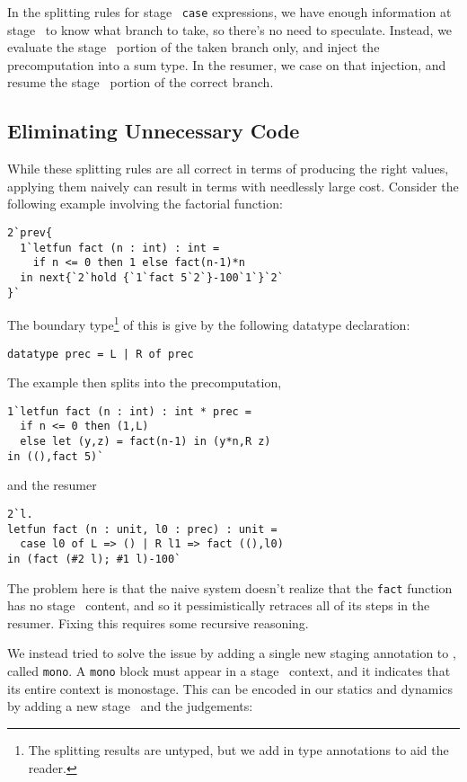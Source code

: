 In the splitting rules for stage \bbone\ {\tt case} expressions, we
have enough information at stage \bbone\ to know what branch to take, so there's
no need to speculate. Instead, we evaluate the stage \bbone\ portion of the
taken branch only, and inject the precomputation into a sum type. In the
resumer, we case on that injection, and resume the stage \bbtwo\ portion of the
correct branch.



\subsection{Eliminating Unnecessary Code}


While these splitting rules are all correct in terms of producing the right values, applying them naively can result in terms with needlessly large cost.  Consider the following example involving the factorial function:
\begin{lstlisting}
2`prev{
  1`letfun fact (n : int) : int = 
    if n <= 0 then 1 else fact(n-1)*n
  in next{`2`hold {`1`fact 5`2`}-100`1`}`2`
}`
\end{lstlisting}

The boundary type\footnote{The splitting results are untyped, but we add in type annotations to aid the reader.} of this is give by the following datatype declaration:
\begin{lstlisting}
datatype prec = L | R of prec
\end{lstlisting}
The example then splits into the precomputation,
\begin{lstlisting}
1`letfun fact (n : int) : int * prec = 
  if n <= 0 then (1,L) 
  else let (y,z) = fact(n-1) in (y*n,R z)
in ((),fact 5)`
\end{lstlisting}
and the resumer
\begin{lstlisting}
2`l.
letfun fact (n : unit, l0 : prec) : unit = 
  case l0 of L => () | R l1 => fact ((),l0)
in (fact (#2 l); #1 l)-100`
\end{lstlisting}
The problem here is that the naive system doesn't realize that the \texttt{fact} function has no stage \bbtwo\ content,
and so it pessimistically retraces all of its steps in the resumer.  
Fixing this requires some recursive reasoning.  

We instead tried to solve the issue by adding a single new staging annotation to \lang, called \texttt{mono}.  
A \texttt{mono} block must appear in a stage \bbone\ context, and it indicates that its entire context is monostage.
This can be encoded in our statics and dynamics by adding a new stage \bbmono\ and the judgements:

